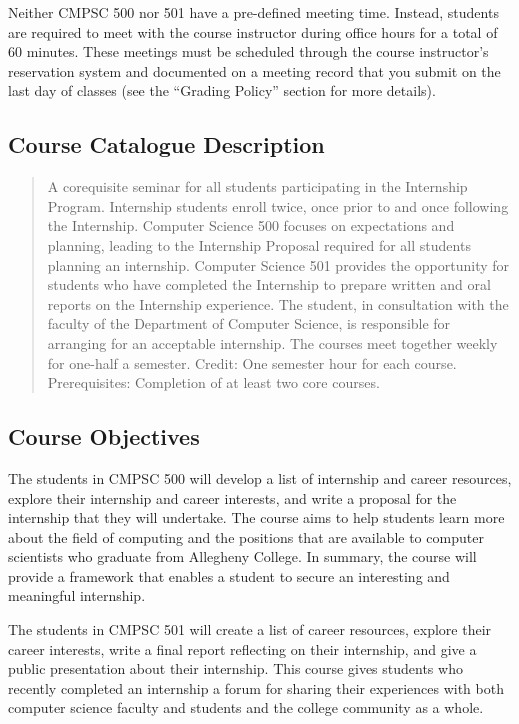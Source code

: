 Neither CMPSC 500 nor 501 have a pre-defined meeting time.  Instead, students are required to meet with the course instructor
during office hours for a total of 60 minutes.  These meetings must be scheduled through the course instructor's reservation
system and documented on a meeting record that you submit on the last day of classes (see the ``Grading Policy''
section for more details).

\subsection*{Course Catalogue Description}

\begin{quote}
  A corequisite seminar for all students participating in the Internship Program.  Internship students enroll twice, once
  prior to and once following the Internship. Computer Science 500 focuses on expectations and planning, leading to the
  Internship Proposal required for all students planning an internship.  Computer Science 501 provides the opportunity for
  students who have completed the Internship to prepare written and oral reports on the Internship experience. The
  student, in consultation with the faculty of the Department of Computer Science, is responsible for arranging for an
  acceptable internship.  The courses meet together weekly for one-half a semester. Credit: One semester hour for each
  course. Prerequisites: Completion of at least two core courses.
\end{quote}

\subsection*{Course Objectives}

The students in CMPSC 500 will develop a list of internship and career resources, explore their internship and career
interests, and write a proposal for the internship that they will undertake. The course aims to help students learn more
about the field of computing and the positions that are available to computer scientists who graduate from Allegheny
College.  In summary, the course will provide a framework that enables a student to secure an interesting and meaningful
internship.

\noindent
The students in CMPSC 501 will create a list of career resources, explore their career interests, write a final report
reflecting on their internship, and give a public presentation about their internship.  This course gives
students who recently completed an internship a forum for sharing their experiences with both computer science faculty
and students and the college community as a whole.

